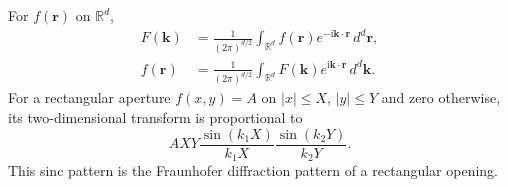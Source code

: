 For $f(\mathbf{r})$ on $\mathbb{R}^d$,
\begin{align}
F(\mathbf{k})&=\frac{1}{(2\pi)^{d/2}}\int_{\mathbb{R}^d}f(\mathbf{r})e^{-\mathrm{i}\mathbf{k}\cdot\mathbf{r}}\,d^d\mathbf{r},\\
f(\mathbf{r})&=\frac{1}{(2\pi)^{d/2}}\int_{\mathbb{R}^d}F(\mathbf{k})e^{\mathrm{i}\mathbf{k}\cdot\mathbf{r}}\,d^d\mathbf{k}.
\end{align}
For a rectangular aperture $f(x,y)=A$ on $|x|\leq X$, $|y|\leq Y$ and zero otherwise, its two-dimensional transform is proportional to
\begin{equation}
AXY\frac{\sin(k_1X)}{k_1X}\frac{\sin(k_2Y)}{k_2Y}.
\end{equation}
This sinc pattern is the Fraunhofer diffraction pattern of a rectangular opening.